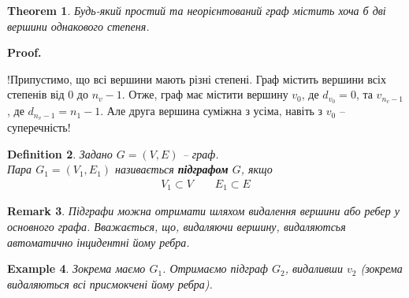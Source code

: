 \documentclass[a4paper, 14pt]{extarticle}
\makeatletter
\theoremstyle{theoremdd}
\newtheorem{theorem}{Theorem}[subsection]
\theoremstyle{theoremdd}
\newtheorem{definition}[theorem]{Definition}
\theoremstyle{theoremdd}
\theoremstyle{theoremdd}
\theoremstyle{theoremdd}
\newtheorem{example}[theorem]{Example}
\theoremstyle{theoremdd}
\theoremstyle{theoremdd}
\theoremstyle{theoremdd}
\theoremstyle{theoremdd}
\theoremstyle{theoremdd}
\theoremstyle{theoremdd}
\newtheorem{remark}[theorem]{Remark}
\theoremstyle{theoremdd}
\theoremstyle{theoremdd}
\theoremstyle{theoremdd}
\theoremstyle{theoremdd}
\renewenvironment{proof}[1][Proof.\\]{\par
\pushQED{\hfill \qed}%
\normalfont \topsep6\p@\@plus6\p@\relax
\trivlist
\item\relax
{\bfseries
#1\@addpunct{.}}\hspace\labelsep\ignorespaces
}{%
\popQED\endtrivlist\@endpefalse
}
\makeatother
\begin{document}
\begin{theorem}
Будь-який простий та неорієнтований граф містить хоча б дві вершини однакового степеня.
\end{theorem}

\begin{proof}
!Припустимо, що всі вершини мають різні степені. Граф містить вершини всіх степенів від $0$ до $n_v - 1$. Отже, граф має містити вершину $v_0$, де $d_{v_0} = 0$, та $v_{n_v-1}$, де $d_{n_v-1} = n_1-1$. Але друга вершина суміжна з усіма, навіть з $v_0$ -- суперечність!
\end{proof}

\begin{definition}
Задано $G = (V,E)$ -- граф.\\
Пара $G_1 = (V_1,E_1)$ називається \textbf{підграфом} $G$, якщо
\begin{align*}
V_1 \subset V \qquad E_1 \subset E
\end{align*}
\end{definition}

\begin{remark}
Підграфи можна отримати шляхом видалення вершини або ребер у основного графа. Вважається, що, видаляючи вершину, видаляютсья автоматично інцидентні йому ребра.
\end{remark}

\begin{example}
Зокрема маємо $G_1$. Отримаємо підграф $G_2$, видаливши $v_2$ (зокрема видаляються всі присмокчені йому ребра).
\begin{figure}[H]
\centering
{}
\qquad
{}
\end{figure}
\end{example}
\end{document}
